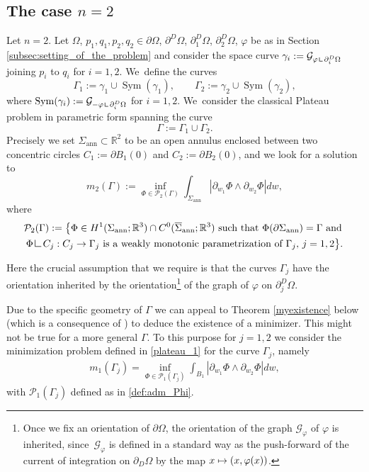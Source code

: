 \documentclass[11pt]{article}
\numberwithin{equation}{section}
\newcommand\mto{\mathchoice{\longmapsto}{\mapsto}{\mapsto}{\mapsto}}
\DeclareMathOperator{\Sym}{Sym}
\newcommand{\R}{\mathbb{R}}
\let\Om\Omega
\newcommand{\openannulus}{\Sigma_\mathrm{ann}}
\newcommand{\resa}{\mathop{\hbox{\vrule height 7pt width 0.5pt depth 0pt
\vrule height 0.5pt width 6pt depth 0pt}}\nolimits}
\newcommand{\resb}{\mathop{\hbox{\vrule height 4pt width 0.5pt depth 0pt
\vrule height 0.5pt width 3pt depth 0pt}}\nolimits}
\newcommand{\res}{\mathchoice{\resa}{\resa}{\resb}{\resb}}
\theoremstyle{definition}
\begin{document}
\subsection{The case $n=2$}\label{sec:the_case_n=2}
Let $n=2$. Let $\Om$, $p_1,q_1,p_2,q_2\in\partial\Om$, $\partial^D\Om$, $\partial_1^D\Om$, $\partial_2^D\Om$, $\varphi$ be as in Section \ref{subsec:setting_of_the_problem} and
consider the space curve $\gamma_i:=\mathcal{G}_{\varphi\res\partial_i^D\Om}$ joining $p_i$ to $q_i$ for $i=1,2$. We~define the curves
\begin{equation*}
\Gamma_1:=\gamma_1\cup\Sym(\gamma_1),\qquad \Gamma_2:=\gamma_2\cup\Sym(\gamma_2),
\end{equation*}
where $\Sym(\gamma_i):=\mathcal{G}_{-\varphi\res\partial_i^D\Om}$ for $i=1,2$. We~consider the
classical Plateau problem in parametric form spanning the curve
\[
\Gamma:=\Gamma_1\cup\Gamma_2.
\]
Precisely we set $\openannulus\subset\R^2$ to be an open annulus
enclosed between two concentric circles { $C_1:=\partial B_1(0)$ and $C_2:=\partial B_2(0)$},
and we look for a solution to
\begin{equation}\label{catenoid_plateau}
m_2(\Gamma):=\inf_{\Phi\in\mathcal{P}_2(\Gamma)}\int_{\openannulus}|\partial_{w_1}\Phi\wedge\partial_{w_2}\Phi|dw,
\end{equation}
where
\begin{multline*}
\mathcal{P}_2(\Gamma):=\big\{\Phi\in H^1(\openannulus;\R^3)\cap C^0(\overline\Sigma_\mathrm{ann};\R^3) \text{ such that }\Phi(\partial \openannulus)=\Gamma\text{ and }\\
\Phi\res C_j:C_j\to \Gamma_j\text{ is a weakly monotonic parametrization of $\Gamma_j$, $j=1,2$}\big\}.
\end{multline*}

Here the crucial assumption that we require is that the curves $\Gamma_j$
have the orientation inherited by the orientation\footnote{Once we fix
an orientation of $\partial \Omega$, the orientation of the graph
$\mathcal G_\varphi$
of $\varphi$ is inherited, since~$\mathcal G_\varphi$
is defined in a standard way as the push-forward of the current of integration on $\partial_D\Om$ by the map $x\mto(x,\varphi(x))$.} of the graph of $\varphi$ on $\partial_j^D\Om$.

Due to the specific geometry of $\Gamma$ we can appeal to Theorem \ref{myexistence} below (which is a consequence of \cite[Th.\,1 \& Th.\,5]{MY}) to deduce the existence of a minimizer. This might not be true for a more general $\Gamma$. To this purpose for $j=1,2$ we consider
the minimization problem defined in \eqref{plateau_1} for the curve $\Gamma_j$, namely
\begin{align}\label{minimizationSigma}
m_1(\Gamma_j)=\inf_{\Phi\in\mathcal{P}_1(\Gamma_j)}\int_{B_1}|\partial_{w_1}\Phi\wedge\partial_{w_2}\Phi|dw,
\end{align}
with $\mathcal{P}_1(\Gamma_j)$ defined as in \eqref{def:adm_Phi}.
\end{document}

